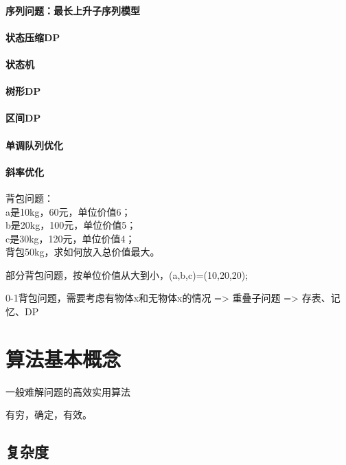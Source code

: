 \documentclass[UTF8]{../computerUniverse}
\begin{document}
\subsubsection{序列问题：最长上升子序列模型}
\subsubsection{状态压缩DP}
\subsubsection{状态机}
\subsubsection{树形DP}
\subsubsection{区间DP}
\subsubsection{单调队列优化}
\subsubsection{斜率优化}












背包问题：\\
a是10kg，60元，单位价值6；\\
b是20kg，100元，单位价值5；\\
c是30kg，120元，单位价值4；\\
背包50kg，求如何放入总价值最大。

部分背包问题，按单位价值从大到小，(a,b,c)=(10,20,20);

0-1背包问题，需要考虑有物体x和无物体x的情况 => 重叠子问题 => 存表、记忆、DP


\chapter{算法基本概念}
一般难解问题的高效实用算法

有穷，确定，有效。

\section{复杂度}
\end{document}

